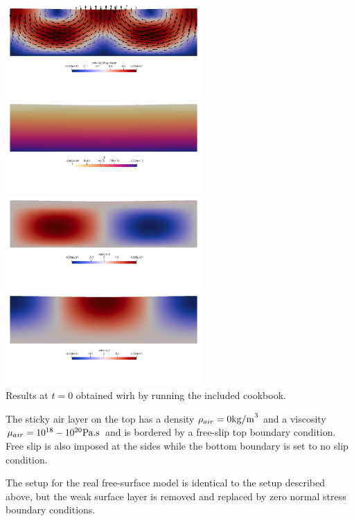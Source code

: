 \begin{center}
\includegraphics[width=7.5cm]{images/benchmark_crsg12/aspect/vel}
\includegraphics[width=7.5cm]{images/benchmark_crsg12/aspect/press}\\
\includegraphics[width=7.5cm]{images/benchmark_crsg12/aspect/u}
\includegraphics[width=7.5cm]{images/benchmark_crsg12/aspect/v}\\
{\captionfont Results at $t=0$ obtained wirh \aspect{} by running the included cookbook.}
\end{center}


The sticky air layer on the top has a density $\rho_{air} =0{\rm kg/m}^3$ and a viscosity $\mu_{air} =10^{18}-10^{20} {\rm Pa.s}$ 
and is bordered by a free-slip top boundary condition. 
Free slip is also imposed at the sides while the bottom boundary is set to no slip condition. 

The setup for the real free-surface model is identical to the setup described above, but  
the weak surface layer is removed and replaced by zero normal stress boundary conditions.


